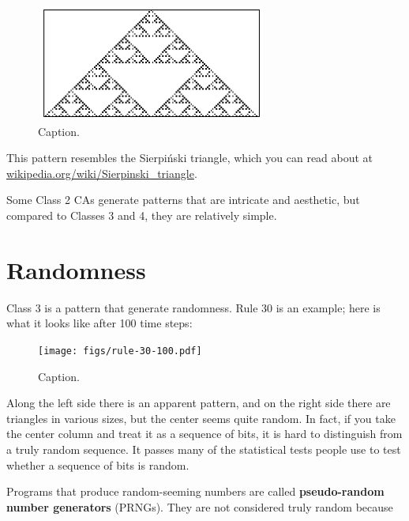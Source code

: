 \documentclass[10pt]{book}
\begin{document}
\begin{figure}
\centerline{\includegraphics[width=3.0in,height=1.5in]{figs/rule-18-64.pdf}}
\caption{Caption.}
\end{figure}

This pattern resembles the Sierpi\'{n}ski triangle, which
you can read about at \url{wikipedia.org/wiki/Sierpinski_triangle}.

Some Class 2 CAs generate patterns that are intricate and
aesthetic, but compared to Classes 3 and 4, they are relatively
simple.


\section{Randomness}

Class 3 is a pattern that generate randomness.
Rule 30 is an example; here is what it looks like
after 100 time steps:

\begin{figure}
\centerline{\texttt{[image: figs/rule-30-100.pdf]}}
\caption{Caption.}
\end{figure}

Along the left side there is an apparent pattern, and on the right
side there are triangles in various sizes, but the center seems
quite random.  In fact, if you take the center column and treat it as a
sequence of bits, it is hard to distinguish from a truly random
sequence.  It passes many of the statistical tests people use
to test whether a sequence of bits is random.

Programs that produce random-seeming numbers are called
{\bf pseudo-random number generators} (PRNGs).  They are not considered
truly random because
\end{document}
